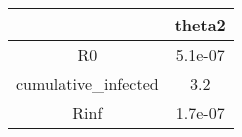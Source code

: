 \begin{tabular}{|c|c|}
\hline
& theta2 \\
\hline
R0 & 5.1e-07 \\
\hline
cumulative_infected & 3.2 \\
\hline
Rinf & 1.7e-07 \\
\hline
\end{tabular}
